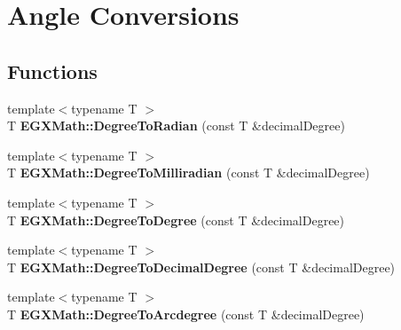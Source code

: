 \hypertarget{group___e_g_x_math-_angle_conversions}{}\section{Angle Conversions}
\label{group___e_g_x_math-_angle_conversions}
\subsection*{Functions}
\begin{DoxyCompactItemize}
\item 
\mbox{\label{group___e_g_x_math-_angle_conversions_ga48585541b228c852c9d08a9eac3682f0}} 
{\footnotesize template$<$typename T $>$ }\\T {\bfseries E\+G\+X\+Math\+::\+Degree\+To\+Radian} (const T \&decimal\+Degree)
\item 
\mbox{\label{group___e_g_x_math-_angle_conversions_gae4fa6c2d3805430760783650cfbfdb11}} 
{\footnotesize template$<$typename T $>$ }\\T {\bfseries E\+G\+X\+Math\+::\+Degree\+To\+Milliradian} (const T \&decimal\+Degree)
\item 
\mbox{\label{group___e_g_x_math-_angle_conversions_gaca157e7d3e99a46a11a04b92680d2574}} 
{\footnotesize template$<$typename T $>$ }\\T {\bfseries E\+G\+X\+Math\+::\+Degree\+To\+Degree} (const T \&decimal\+Degree)
\item 
\mbox{\label{group___e_g_x_math-_angle_conversions_ga568afc1d436d425bf5d4edea584aee08}} 
{\footnotesize template$<$typename T $>$ }\\T {\bfseries E\+G\+X\+Math\+::\+Degree\+To\+Decimal\+Degree} (const T \&decimal\+Degree)
\item 
\mbox{\label{group___e_g_x_math-_angle_conversions_gac1b5f3b68f66c77a6df4ceef842c9b19}} 
{\footnotesize template$<$typename T $>$ }\\T {\bfseries E\+G\+X\+Math\+::\+Degree\+To\+Arcdegree} (const T \&decimal\+Degree)
\item 
\mbox{\label{group___e_g_x_math-_angle_conversions_ga8abf327dc5f52907b2c881999e9cc43e}} 

\end{DoxyCompactItemize}
